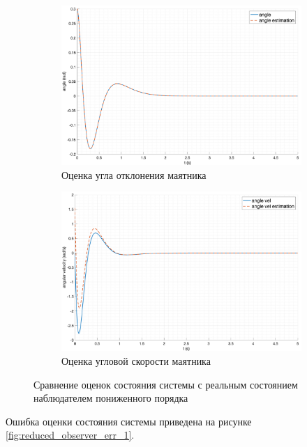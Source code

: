 \begin{figure}[ht!]
\begin{subfigure}[b]{0.45\textwidth}
        \includegraphics[width=\textwidth]{media/plots/reduced_observer/reduced_observer_theta_cmp_1.png}
        \caption{Оценка угла отклонения маятника}
        \label{fig:reduced_observer_theta_cmp_1}
    \end{subfigure}
    \begin{subfigure}[b]{0.45\textwidth}
        \includegraphics[width=\textwidth]{media/plots/reduced_observer/reduced_observer_dottheta_cmp_1.png}
        \caption{Оценка угловой скорости маятника}
        \label{fig:reduced_observer_dottheta_cmp_1}
    \end{subfigure}
    \caption{Сравнение оценок состояния системы с реальным состоянием наблюдателем пониженного порядка}
    \label{fig:reduced_observer_x_cmp_1_sep}
\end{figure}
Ошибка оценки состояния системы приведена на рисунке \ref{fig:reduced_observer_err_1}.
